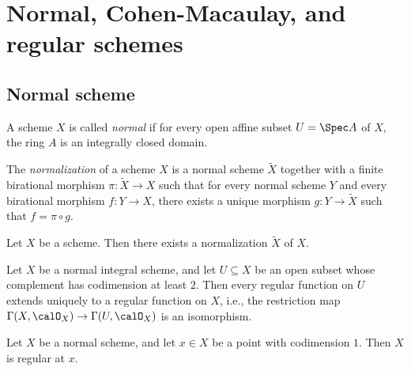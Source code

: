 \section{Normal, Cohen-Macaulay, and regular schemes}


\subsection{Normal scheme}

    \begin{definition}\label{def:normal_scheme}
        A scheme \(X\) is called \emph{normal} if for every open affine subset \(U = \Spec A\) of \(X\), the ring \(A\) is an integrally closed domain.
    \end{definition}

    \begin{definition}\label{def:normalization}
        The \emph{normalization} of a scheme \(X\) is a normal scheme \(\widetilde{X}\) together with a finite birational morphism \(\pi:\widetilde{X}\to X\) such that for every normal scheme \(Y\) and every birational morphism \(f:Y\to X\), there exists a unique morphism \(g:Y\to \widetilde{X}\) such that \(f = \pi \circ g\).
    \end{definition}

    \begin{theorem}\label{thm:existence_of_normalization}
        Let \(X\) be a scheme. Then there exists a normalization \(\widetilde{X}\) of \(X\).
    \end{theorem}

    \begin{theorem}\label{thm:Hartogs_phenomenon}
        Let \(X\) be a normal integral scheme, and let \(U\subseteq X\) be an open subset whose complement has codimension at least \(2\).
        Then every regular function on \(U\) extends uniquely to a regular function on \(X\), i.e., the restriction map \(\Gamma(X,\calO_X) \to \Gamma(U,\calO_X)\) is an isomorphism.
    \end{theorem}

    \begin{proposition}\label{prop:normal_scheme_is_regular_in_codimension_1}
        Let \(X\) be a normal scheme, and let \(x \in X\) be a point with codimension \(1\). Then \(X\) is regular at \(x\).
    \end{proposition}

